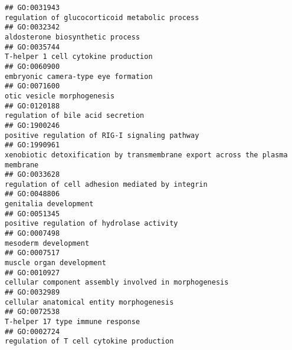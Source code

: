 \documentclass[
]{article}
\begin{document}
\begin{verbatim}
## GO:0031943                                                                                                   regulation of glucocorticoid metabolic process
## GO:0032342                                                                                                                 aldosterone biosynthetic process
## GO:0035744                                                                                                              T-helper 1 cell cytokine production
## GO:0060900                                                                                                              embryonic camera-type eye formation
## GO:0071600                                                                                                                       otic vesicle morphogenesis
## GO:0120188                                                                                                                regulation of bile acid secretion
## GO:1900246                                                                                                   positive regulation of RIG-I signaling pathway
## GO:1990961                                                                     xenobiotic detoxification by transmembrane export across the plasma membrane
## GO:0033628                                                                                                 regulation of cell adhesion mediated by integrin
## GO:0048806                                                                                                                            genitalia development
## GO:0051345                                                                                                        positive regulation of hydrolase activity
## GO:0007498                                                                                                                             mesoderm development
## GO:0007517                                                                                                                         muscle organ development
## GO:0010927                                                                                            cellular component assembly involved in morphogenesis
## GO:0032989                                                                                                         cellular anatomical entity morphogenesis
## GO:0072538                                                                                                                 T-helper 17 type immune response
## GO:0002724                                                                                                         regulation of T cell cytokine production

\end{verbatim}
\end{document}
